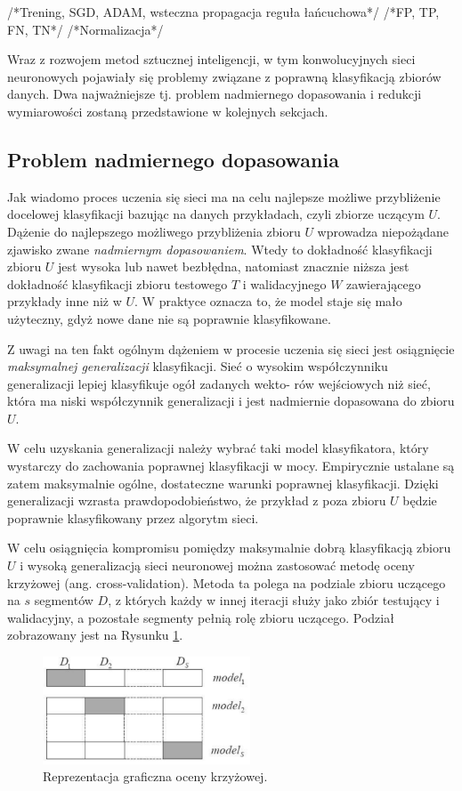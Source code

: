 /*Trening, SGD, ADAM, wsteczna propagacja reguła łańcuchowa*/
/*FP, TP, FN, TN*/
/*Normalizacja*/

Wraz z rozwojem metod sztucznej inteligencji, w tym konwolucyjnych sieci neuronowych pojawiały się problemy związane z poprawną klasyfikacją zbiorów danych. Dwa najważniejsze tj. problem nadmiernego dopasowania i redukcji wymiarowości zostaną przedstawione w kolejnych sekcjach.

\subsection{Problem nadmiernego dopasowania}
\label{sec-overffiting}

Jak wiadomo proces uczenia się sieci ma na celu najlepsze możliwe przybliżenie docelowej klasyfikacji bazując na danych przykładach, czyli zbiorze uczącym $U$. Dążenie do najlepszego możliwego przybliżenia zbioru $U$ wprowadza niepożądane zjawisko zwane \textit{nadmiernym dopasowaniem}. Wtedy to dokładność klasyfikacji zbioru $U$ jest wysoka lub nawet bezbłędna, natomiast znacznie niższa jest dokładność klasyfikacji zbioru testowego $T$ i walidacyjnego $W$ zawierającego przykłady inne niż w $U$. W praktyce oznacza to, że model staje się mało użyteczny, gdyż nowe dane nie są poprawnie klasyfikowane.

Z uwagi na ten fakt ogólnym dążeniem w procesie uczenia się sieci jest osiągnięcie \textit{maksymalnej generalizacji} klasyfikacji. Sieć o wysokim współczynniku generalizacji lepiej klasyfikuje ogół zadanych wekto-
rów wejściowych niż sieć, która ma niski współczynnik generalizacji i jest nadmiernie dopasowana do zbioru $U$.

W celu uzyskania generalizacji należy wybrać taki model klasyfikatora, który wystarczy do zachowania
poprawnej klasyfikacji w mocy. Empirycznie ustalane są zatem maksymalnie ogólne, dostateczne warunki poprawnej klasyfikacji. Dzięki generalizacji wzrasta prawdopodobieństwo, że przykład z poza zbioru $U$ będzie poprawnie klasyfikowany przez algorytm sieci.

W celu osiągnięcia kompromisu pomiędzy maksymalnie dobrą klasyfikacją zbioru $U$ i wysoką generalizacją sieci neuronowej można zastosować metodę oceny krzyżowej (ang. cross-validation). Metoda ta polega na podziale zbioru uczącego na $s$ segmentów $D$, z których każdy w innej iteracji służy jako zbiór testujący i walidacyjny, a pozostałe segmenty pełnią rolę zbioru uczącego. Podział zobrazowany jest na Rysunku \ref{cross-validation}.
\begin{figure}[h!]
	\centering
	\includegraphics[width=0.55\textwidth]{figures/cross-validation.png}
	\caption{Reprezentacja graficzna oceny krzyżowej.}
	\label{cross-validation}
\end{figure}

